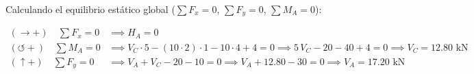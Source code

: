 
Calculando el equilibrio estático global ($\sum F_x = 0$, $\sum F_y = 0$, $\sum M_A = 0$):

\begin{align}

    (\rightarrow +) \quad \sum F_x = 0      & \implies \boxed{H_A = 0}                                                                                                                  \\

    (\circlearrowleft +) \quad \sum M_A = 0 & \implies V_C \cdot 5 - (10 \cdot 2) \cdot 1 - 10 \cdot 4 + 4 = 0 \implies 5\,V_C - 20 - 40 + 4 = 0 \implies \boxed{V_C = 12.80\text{ kN}} \\

    (\uparrow +) \quad \sum F_y = 0         & \implies V_A + V_C - 20 - 10 = 0 \implies V_A + 12.80 - 30 = 0 \implies \boxed{V_A = 17.20\text{ kN}}

\end{align}






